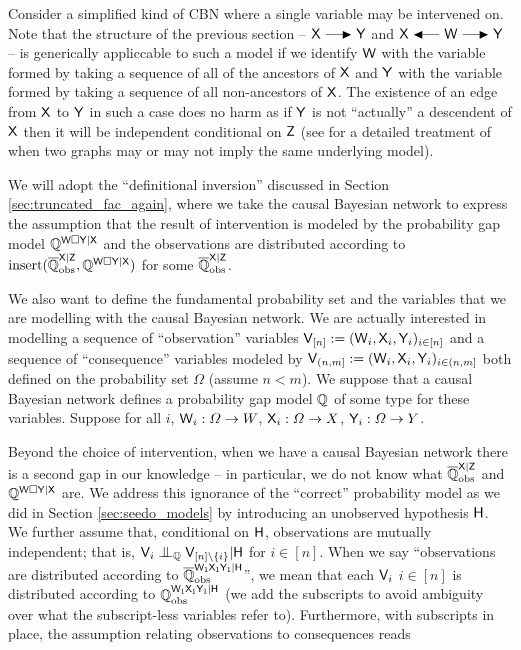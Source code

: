 Consider a simplified kind of CBN where a single variable may be intervened on. Note that the structure of the previous section -- $\RV{X}\longrightarrowRHD \RV{Y}$ and $\RV{X}\longleftarrowRHD \RV{W} \longrightarrowRHD \RV{Y}$ -- is generically appliccable to such a model if we identify $\mathsf{W}$ with the variable formed by taking a sequence of all of the ancestors of $\mathsf{X}$ and $\mathsf{Y}$ with the variable formed by taking a sequence of all non-ancestors of $\mathsf{X}$. The existence of an edge from $\mathsf{X}$ to $\mathsf{Y}$ in such a case does no harm as if $\mathsf{Y}$ is not ``actually'' a descendent of $\mathsf{X}$ then it will be independent conditional on $\mathsf{Z}$ (see \citet{pearl_book_2018} for a detailed treatment of when two graphs may or may not imply the same underlying model).

We will adopt the ``definitional inversion'' discussed in Section \ref{sec:truncated_fac_again}, where we take the causal Bayesian network to express the assumption that the result of intervention is modeled by the probability gap model $\mathbb{Q}^{\mathsf{W}\square \mathsf{Y}|\mathsf{X}}$ and the observations are distributed according to $\text{insert}(\overline{\mathbb{Q}}_{\text{obs}}^{\mathsf{X}|\mathsf{Z}},\mathbb{Q}^{\mathsf{W}\square\mathsf{Y}|\mathsf{X}})$ for some $\overline{\mathbb{Q}}_{\text{obs}}^{\mathsf{X}|\mathsf{Z}}$.

We also want to define the fundamental probability set and the variables that we are modelling with the causal Bayesian network. We are actually interested in modelling a sequence of ``observation'' variables $\mathsf{V}_{[n]}:=(\mathsf{W}_i,\mathsf{X}_i,\mathsf{Y}_i)_{i\in [n]}$ and a sequence of ``consequence'' variables modeled by $\mathsf{V}_{(n,m]}:=(\mathsf{W}_i,\mathsf{X}_i,\mathsf{Y}_i)_{i\in (n,m]}$ both defined on the probability set $\Omega$ (assume $n<m$). We suppose that a causal Bayesian network defines a probability gap model $\mathbb{Q}$ of some type for these variables. Suppose for all $i$, $\mathsf{W}_i:\Omega\to W$, $\mathsf{X}_i:\Omega\to X$, $\mathsf{Y}_i:\Omega\to Y$.

Beyond the choice of intervention, when we have a causal Bayesian network there is a second gap in our knowledge -- in particular, we do not know what $\overline{\mathbb{Q}}_{\text{obs}}^{\mathsf{X}|\mathsf{Z}}$ and $\mathbb{Q}^{\mathsf{W}\square\mathsf{Y}|\mathsf{X}}$ are. We address this ignorance of the ``correct'' probability model as we did in Section \ref{sec:seedo_models} by introducing an unobserved hypothesis $\mathsf{H}$. We further assume that, conditional on $\mathsf{H}$, observations are mutually independent; that is, $\RV{V}_i\CI_{\model{Q}} \RV{V}_{[n]\setminus \{i\}}|\RV{H}$ for $i\in [n]$. When we say ``observations are distributed according to $\overline{\mathbb{Q}}_{\text{obs}}^{\mathsf{W_1X_1Y_1}|\mathsf{H}}$'', we mean that each $\mathsf{V}_i$ $i\in [n]$ is distributed according to $\mathbb{Q}_{\text{obs}}^{\mathsf{W_1X_1Y_1}|\mathsf{H}}$ (we add the subscripts to avoid ambiguity over what the subscript-less variables refer to). Furthermore, with subscripts in place, the assumption relating observations to consequences reads

